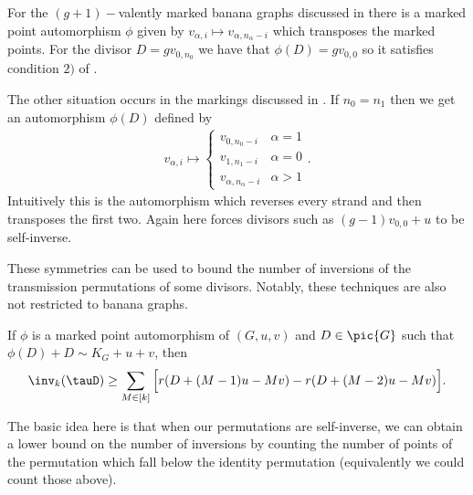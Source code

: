 \begin{example}
    For the $(g+1)-$valently marked banana graphs discussed in  there is a marked point automorphism $\phi$ given by $v_{\alpha,i}\mapsto v_{\alpha,n_\alpha-i}$ which transposes the marked points. For the divisor $D = gv_{0,n_0}$ we have that $\phi(D) = gv_{0,0}$ so it satisfies condition $2)$ of .

    The other situation  occurs in the markings discussed in . If $n_0 = n_1$ then we get an automorphism $\phi(D)$ defined by
    \begin{align*}
        v_{\alpha,i}\mapsto \begin{cases}
            v_{0,n_0-i} & \alpha  = 1\\
            v_{1,n_1-i} & \alpha  = 0\\
            v_{\alpha,n_\alpha-i} & \alpha>1
        \end{cases}.
    \end{align*}
    Intuitively this is the automorphism which reverses every strand and then transposes the first two. Again here  forces divisors such as $(g-1)v_{0,0}+u$ to be self-inverse.
\end{example}

These symmetries can be used to bound the number of inversions of the transmission permutations of some divisors. Notably, these techniques are also not restricted to banana graphs.
\begin{prop}
    If $\phi$ is a marked point automorphism of $(G,u,v)$ and $D \in \pic{G}$ such that $\phi(D) + D \sim K_G + u + v$, then
    \begin{align*}
        \inv_k(\tauD) \geq \sum_{M \in [k]} \Big[ r(D+(M-1)u-Mv) - r(D+(M-2)u-Mv) \Big].
    \end{align*}
\end{prop}

The basic idea here is that when our permutations are self-inverse, we can obtain a lower bound on the number of inversions by counting the number of points of the permutation which fall below the identity permutation (equivalently we could count those above).

